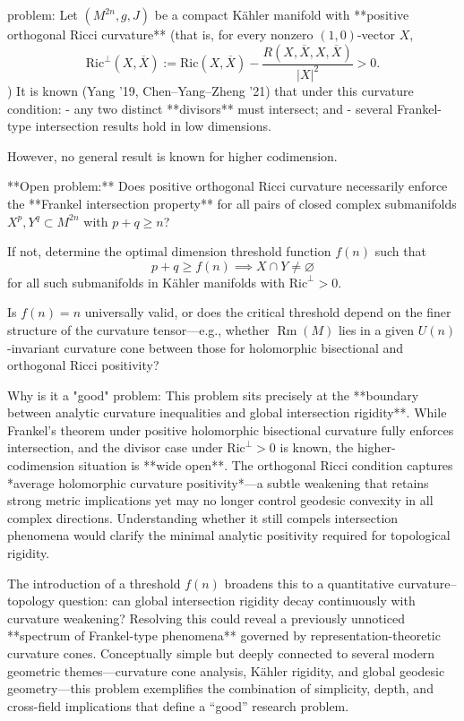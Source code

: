 problem:  
Let \((M^{2n}, g, J)\) be a compact Kähler manifold with **positive orthogonal Ricci curvature** (that is, for every nonzero \((1,0)\)-vector \(X\),  
\[
\mathrm{Ric}^\perp(X,\overline{X}) := \mathrm{Ric}(X,\overline{X}) - \frac{R(X,\overline{X},X,\overline{X})}{|X|^2} > 0.
\]  
)  
It is known (Yang ’19, Chen–Yang–Zheng ’21) that under this curvature condition:
- any two distinct **divisors** must intersect; and  
- several Frankel-type intersection results hold in low dimensions.  

However, no general result is known for higher codimension.

**Open problem:**  
Does positive orthogonal Ricci curvature necessarily enforce the **Frankel intersection property** for all pairs of closed complex submanifolds \(X^p, Y^q \subset M^{2n}\) with \(p+q\ge n\)?  

If not, determine the optimal dimension threshold function \(f(n)\) such that  
\[
p+q \ge f(n) \implies X \cap Y \neq \varnothing
\]  
for all such submanifolds in Kähler manifolds with \(\mathrm{Ric}^\perp>0\).  

Is \(f(n)=n\) universally valid, or does the critical threshold depend on the finer structure of the curvature tensor—e.g., whether \(\operatorname{Rm}(M)\) lies in a given \(U(n)\)-invariant curvature cone between those for holomorphic bisectional and orthogonal Ricci positivity?

Why is it a "good" problem:  
This problem sits precisely at the **boundary between analytic curvature inequalities and global intersection rigidity**. While Frankel’s theorem under positive holomorphic bisectional curvature fully enforces intersection, and the divisor case under \(\mathrm{Ric}^\perp>0\) is known, the higher-codimension situation is **wide open**. The orthogonal Ricci condition captures *average holomorphic curvature positivity*—a subtle weakening that retains strong metric implications yet may no longer control geodesic convexity in all complex directions. Understanding whether it still compels intersection phenomena would clarify the minimal analytic positivity required for topological rigidity.  

The introduction of a threshold \(f(n)\) broadens this to a quantitative curvature–topology question: can global intersection rigidity decay continuously with curvature weakening? Resolving this could reveal a previously unnoticed **spectrum of Frankel-type phenomena** governed by representation-theoretic curvature cones. Conceptually simple but deeply connected to several modern geometric themes—curvature cone analysis, Kähler rigidity, and global geodesic geometry—this problem exemplifies the combination of simplicity, depth, and cross-field implications that define a “good” research problem.
